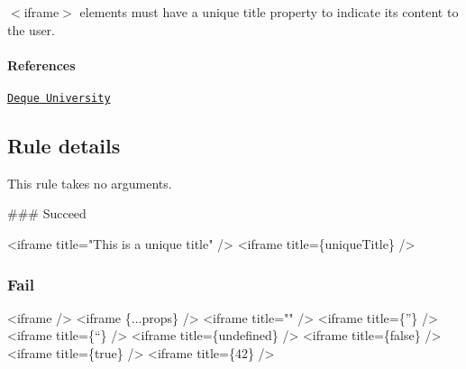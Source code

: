 {\ttfamily $<$iframe$>$} elements must have a unique title property to indicate its content to the user.

\paragraph*{References}


\begin{DoxyEnumerate}
\item \href{https://dequeuniversity.com/rules/axe/1.1/frame-title}{\tt Deque University}
\end{DoxyEnumerate}

\subsection*{Rule details}

This rule takes no arguments.

\#\#\# Succeed 
\begin{DoxyCode}
<iframe title="This is a unique title" />
<iframe title=\{uniqueTitle\} />
\end{DoxyCode}


\subsubsection*{Fail}


\begin{DoxyCode}
<iframe />
<iframe \{...props\} />
<iframe title="" />
<iframe title=\{''\} />
<iframe title=\{``\} />
<iframe title=\{undefined\} />
<iframe title=\{false\} />
<iframe title=\{true\} />
<iframe title=\{42\} />
\end{DoxyCode}
 